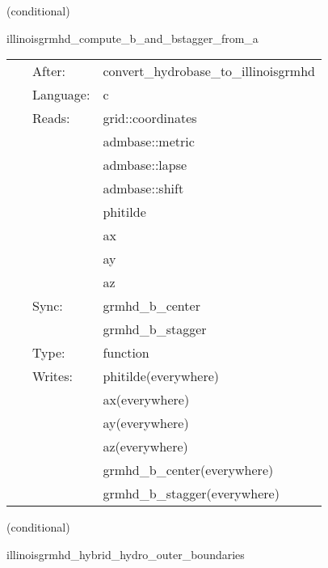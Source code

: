 \vspace{5mm}

   (conditional) 

\hspace{5mm} illinoisgrmhd\_compute\_b\_and\_bstagger\_from\_a 

\hspace{5mm}{\it compute b and b\_stagger from a } 


\hspace{5mm}

 \begin{tabular*}{160mm}{cll} 
~ & After:  & convert\_hydrobase\_to\_illinoisgrmhd \\ 
~ & Language:  & c \\ 
~ & Reads:  & grid::coordinates \\ 
~& ~ &admbase::metric\\ 
~& ~ &admbase::lapse\\ 
~& ~ &admbase::shift\\ 
~& ~ &phitilde\\ 
~& ~ &ax\\ 
~& ~ &ay\\ 
~& ~ &az\\ 
~ & Sync:  & grmhd\_b\_center \\ 
~& ~ &grmhd\_b\_stagger\\ 
~ & Type:  & function \\ 
~ & Writes:  & phitilde(everywhere) \\ 
~& ~ &ax(everywhere)\\ 
~& ~ &ay(everywhere)\\ 
~& ~ &az(everywhere)\\ 
~& ~ &grmhd\_b\_center(everywhere)\\ 
~& ~ &grmhd\_b\_stagger(everywhere)\\ 
\end{tabular*} 


\vspace{5mm}

   (conditional) 

\hspace{5mm} illinoisgrmhd\_hybrid\_hydro\_outer\_boundaries 

\hspace{5mm}{\it hybrid version of illinoisgrmhd\_outer\_boundaries } 


\hspace{5mm}

